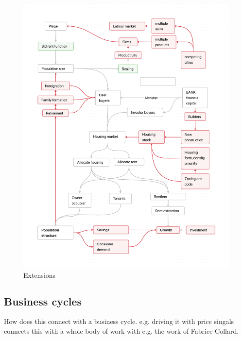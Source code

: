{\newpage\thispagestyle{empty}
\vspace{-1.5cm}
\begin{figure}
\vspace{-4.5cm}
\begin{adjustwidth}{-0.24\textwidth}{-0.2\textwidth}
\centering
\includegraphics[scale=.22]{fig/extensions-logic.png}
\end{adjustwidth}
\caption{Extensions}
\label{fig-extensions-logic}
\end{figure}}



\subsection{Business cycles}
How does this connect with a business cycle. e.g. driving it with price singals connects this with a whole body of work with e.g. the work of Fabrice Collard. 

